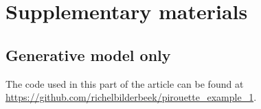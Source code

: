 \section{Supplementary materials}

\subsection{Generative model only}

The code used in this part of the article can be found at 
\url{https://github.com/richelbilderbeek/pirouette_example_1}. 

